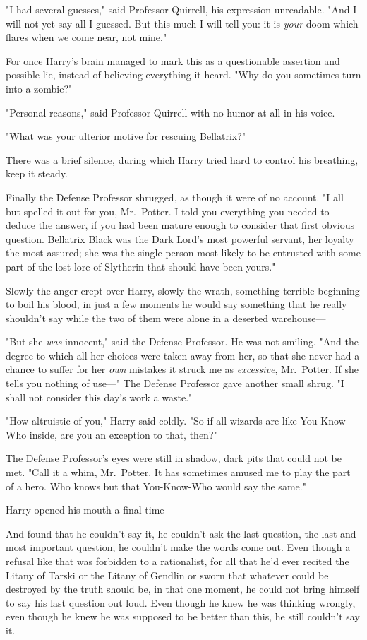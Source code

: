 "I had several guesses," said Professor Quirrell, his expression unreadable.
"And I will not yet say all I guessed. But this much I will tell you: it is
\emph{your} doom which flares when we come near, not mine."

For once Harry's brain managed to mark this as a questionable assertion and
possible lie, instead of believing everything it heard. "Why do you sometimes
turn into a zombie?"

"Personal reasons," said Professor Quirrell with no humor at all in his voice.

"What was your ulterior motive for rescuing Bellatrix?"

There was a brief silence, during which Harry tried hard to control his
breathing, keep it steady.

Finally the Defense Professor shrugged, as though it were of no account. "I all
but spelled it out for you, Mr.~Potter. I told you everything you needed to
deduce the answer, if you had been mature enough to consider that first obvious
question. Bellatrix Black was the Dark Lord's most powerful servant, her
loyalty the most assured; she was the single person most likely to be entrusted
with some part of the lost lore of Slytherin that should have been yours."

Slowly the anger crept over Harry, slowly the wrath, something terrible
beginning to boil his blood, in just a few moments he would say something that
he really shouldn't say while the two of them were alone in a deserted
warehouse---

"But she \emph{was} innocent," said the Defense Professor. He was not smiling.
"And the degree to which all her choices were taken away from her, so that she
never had a chance to suffer for her \emph{own} mistakes{\el} it struck me
as \emph{excessive}, Mr.~Potter. If she tells you nothing of use\mbox{---}" The
Defense Professor gave another small shrug. "I shall not consider this day's
work a waste."

"How altruistic of you," Harry said coldly. "So if all wizards are like
You-Know-Who inside, are you an exception to that, then?"

The Defense Professor's eyes were still in shadow, dark pits that could not be
met. "Call it a whim, Mr.~Potter. It has sometimes amused me to play the part
of a hero. Who knows but that You-Know-Who would say the same."

Harry opened his mouth a final time---

And found that he couldn't say it, he couldn't ask the last question, the last
and most important question, he couldn't make the words come out. Even though a
refusal like that was forbidden to a rationalist, for all that he'd ever
recited the Litany of Tarski or the Litany of Gendlin or sworn that whatever
could be destroyed by the truth should be, in that one moment, he could not
bring himself to say his last question out loud. Even though he knew he was
thinking wrongly, even though he knew he was supposed to be better than this,
he still couldn't say it.

